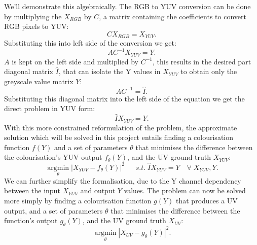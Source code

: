 \documentclass{l4proj}
\begin{document}
We'll demonstrate this algebraically. The RGB to YUV conversion can be done by multiplying the $X_{RGB}$ by $C$, a matrix containing the coefficients to convert RGB pixels to YUV:
\begin{equation}
    C X_{RGB} = X_{YUV}.
\end{equation}
Substituting this into left side of the conversion we get:
\begin{equation}
    A C^{-1} X_{YUV} = Y.
\end{equation}
$A$ is kept on the left side and multiplied by $C^{-1}$, this results in the desired part diagonal matrix $\hat{I}$, that can isolate the Y values in $X_{YUV}$ to obtain only the greyscale value matrix $Y$:
\begin{equation}
    A C^{-1} = \hat{I}.
\end{equation}
Substituting this diagonal matrix into the left side of the equation we get the direct problem in YUV form:
\begin{equation}
    \hat{I} X_{YUV} = Y.
\end{equation}
With this more constrained reformulation of the problem, the approximate solution which will be solved in this project entails finding a colourisation function $f(Y)$ and a set of parameters $\theta$ that minimises the difference between the colourisation's YUV output $f_{\theta}(Y)$, and the UV ground truth $X_{YUV}$:
\begin{equation}
    \underset{\theta}{\operatorname{arg min}} |X_{YUV}-f_{\theta}(Y)|^2 \quad\;\; s.t. \; \hat{I} X_{YUV} = Y \quad \forall \; X_{YUV}, Y.
\end{equation}
We can further simplify the formalisation, due to the Y channel dependency between the input $X_{YUV}$ and output $Y$ values. The problem can now be solved more simply by finding a colourisation function $g(Y)$ that produces a UV output, and a set of parameters $\theta$ that minimises the difference between the function's output $g_{\theta}(Y)$, and the UV ground truth $X_{UV}$:
\begin{equation}
    \underset{\theta}{\operatorname{arg min}} |X_{UV}-g_{\theta}(Y)|^2.
\end{equation}
\end{document}

